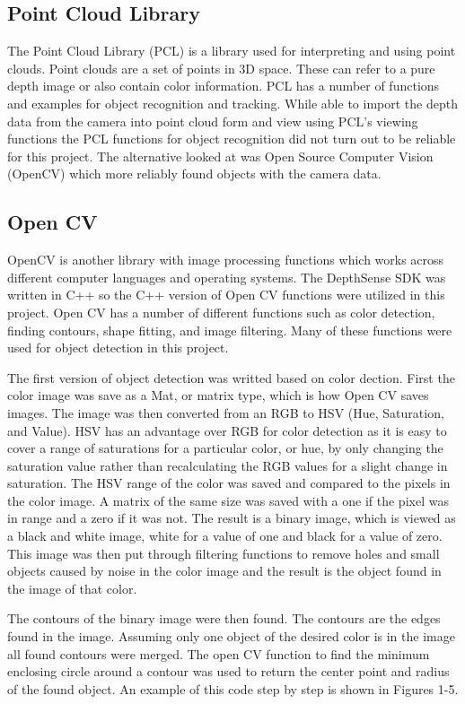 \documentclass[letterpaper,12pt]{report}
\begin{document}
\subsection{Point Cloud Library}
The Point Cloud Library (PCL) is a library used for interpreting and using point clouds. Point clouds are a set of points in 3D space. These can refer to a pure depth image or also contain color information. PCL has a number of functions and examples for object recognition and tracking. While able to import the depth data from the camera into point cloud form and view using PCL's viewing functions the PCL functions for object recognition did not turn out to be reliable for this project. The alternative looked at was Open Source Computer Vision (OpenCV) which more reliably found objects with the camera data. 

\subsection{Open CV}
OpenCV is another library with image processing functions which works across different computer languages and operating systems. The DepthSense SDK was written in C++ so the C++ version of Open CV functions were utilized in this project. Open CV has a number of different functions such as color detection, finding contours, shape fitting, and image filtering. Many of these functions were used for object detection in this project.

The first version of object detection was writted based on color dection. First the color image was save as a Mat, or matrix type, which is how Open CV saves images. The image was then converted from an RGB to HSV (Hue, Saturation, and Value). HSV has an advantage over RGB for color detection as it is easy to cover a range of saturations for a particular color, or hue, by only changing the saturation value rather than recalculating the RGB values for a slight change in saturation. The HSV range of the color was saved and compared to the pixels in the color image. A matrix of the same size was saved with a one if the pixel was in range and a zero if it was not. The result is a binary image, which is viewed as a black and white image, white for a value of one and black for a value of zero. This image was then put through filtering functions to remove holes and small objects caused by noise in the color image and the result is the object found in the image of that color.

The contours of the binary image were then found. The contours are the edges found in the image. Assuming only one object of the desired color is in the image all found contours were merged. The open CV function to find the minimum enclosing circle around a contour was used to return the center point and radius of the found object. An example of this code step by step is shown in Figures 1-5.
\end{document}
